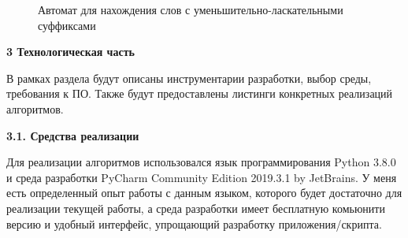 \documentclass[a4paper,12pt]{report}
\begin{document}
		\begin{figure}[h!]
			\caption{Автомат для нахождения слов с уменьшительно-ласкательными суффиксами}
			\label{ris:automat}
		\end{figure}

    \newpage

    \begin{center}
        \textbf{3 Технологическая часть}
    \end{center}
        \label{sec:tecnologic_part}

			В рамках раздела будут описаны инструментарии разработки, выбор среды, требования к ПО. 
			Также будут предоставлены листинги конкретных реализаций алгоритмов.
	
	\begin{center}
        \textbf{3.1. Средства реализации}
    \end{center}

        	Для реализации алгоритмов использовался язык программирования Python 3.8.0 и среда разработки PyCharm Community Edition 2019.3.1 by JetBrains. 
        	У меня есть определенный опыт работы с данным языком, которого будет достаточно для реализации текущей работы, а среда разработки имеет бесплатную комьюнити версию и удобный интерфейс, упрощающий разработку приложения/скрипта.
\end{document}
